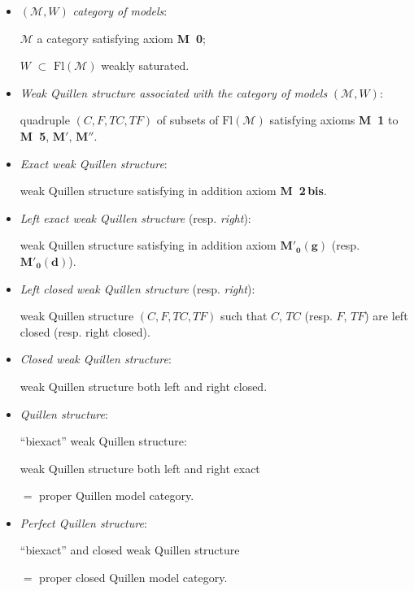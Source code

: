 \documentclass[11pt]{article}
\newcommand{\printedpage}[1]{\marginpar{\footnotesize p.~#1}}
\newcommand{\Fl}{\mathrm{Fl}}
\newcommand{\Mo}{\mathcal{M}}
\newcommand{\Mzg}{$\mathbf{M}'_{\mathbf{0}}\mathbf{(g)}$}
\newcommand{\Mzd}{$\mathbf{M}'_{\mathbf{0}}\mathbf{(d)}$}
\begin{document}
\begin{itemize}
\item[\textbullet] $(\Mo,W)$ \textit{category of models}:

$\Mo$ a category satisfying axiom \textbf{M~0};

$W$ $\subset$ $\Fl(\Mo)$ weakly saturated.

\item[\textbullet] \textit{Weak Quillen structure associated with the category of models} $(\Mo,W)$:

quadruple $(C,F,TC,TF)$ of subsets of $\Fl(\Mo)$ satisfying axioms \textbf{M~1} to \textbf{M~5}, $\mathbf{M}'$, $\mathbf{M}''$.

\item[\textbullet] \textit{Exact weak Quillen structure}:

weak Quillen structure satisfying in addition axiom \textbf{M~2\,bis}.

\item[\textbullet] \textit{Left exact weak Quillen structure} (resp. \textit{right}):

weak Quillen structure satisfying in addition axiom \Mzg{} (resp. \Mzd).
\end{itemize}

\printedpage{61}

\begin{itemize}
\item[\textbullet] \textit{Left closed weak Quillen structure} (resp. \textit{right}):

weak Quillen structure $(C,F,TC,TF)$ such that $C$, $TC$ (resp. $F$, $TF$) are left closed (resp. right closed).

\item[\textbullet] \textit{Closed weak Quillen structure}:

weak Quillen structure both left and right closed.

\item[\textbullet] \textit{Quillen structure}:

``biexact'' weak Quillen structure:

weak Quillen structure both left and right exact

$=$ proper Quillen model category.

\item[\textbullet] \textit{Perfect Quillen structure}:

``biexact'' and closed weak Quillen structure

$=$ proper closed Quillen model category.
\end{itemize}
\end{document}
